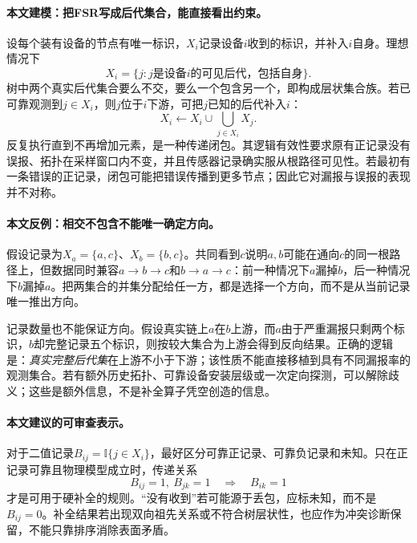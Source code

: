 \paragraph{本文建模：把FSR写成后代集合，能直接看出约束。}
设每个装有设备的节点有唯一标识，$X_i$记录设备$i$收到的标识，并补入$i$自身。理想情况下
\begin{equation}
 X_i=\{j:j\text{是设备}i\text{的可见后代，包括自身}\}.
 \label{eq:p4-descendant-set}
\end{equation}
树中两个真实后代集合要么不交，要么一个包含另一个，即构成层状集合族。若已可靠观测到$j\in X_i$，则$j$位于$i$下游，可把$j$已知的后代补入$i$：
\begin{equation}
 X_i\leftarrow X_i\cup\!\bigcup_{j\in X_i}X_j.
 \label{eq:p4-closure}
\end{equation}
反复执行直到不再增加元素，是一种传递闭包。其逻辑有效性要求原有正记录没有误报、拓扑在采样窗口内不变，并且传感器记录确实服从根路径可见性。若最初有一条错误的正记录，闭包可能把错误传播到更多节点；因此它对漏报与误报的表现并不对称。

\paragraph{本文反例：相交不包含不能唯一确定方向。}
假设记录为$X_a=\{a,c\}$、$X_b=\{b,c\}$。共同看到$c$说明$a,b$可能在通向$c$的同一根路径上，但数据同时兼容$a\to b\to c$和$b\to a\to c$：前一种情况下$a$漏掉$b$，后一种情况下$b$漏掉$a$。把两集合的并集分配给任一方，都是选择一个方向，而不是从当前记录唯一推出方向。

记录数量也不能保证方向。假设真实链上$a$在$b$上游，而$a$由于严重漏报只剩两个标识，$b$却完整记录五个标识，则按较大集合为上游会得到反向结果。正确的逻辑是：\emph{真实完整后代集}在上游不小于下游；该性质不能直接移植到具有不同漏报率的观测集合。若有额外历史拓扑、可靠设备安装层级或一次定向探测，可以解除歧义；这些是额外信息，不是补全算子凭空创造的信息。

\paragraph{本文建议的可审查表示。}
对于二值记录$B_{ij}=\mathbb I\{j\in X_i\}$，最好区分可靠正记录、可靠负记录和未知。只在正记录可靠且物理模型成立时，传递关系
\begin{equation}
 B_{ij}=1,\ B_{jk}=1\quad\Longrightarrow\quad B_{ik}=1
 \label{eq:p4-transitivity}
\end{equation}
才是可用于硬补全的规则。“没有收到”若可能源于丢包，应标未知，而不是$B_{ij}=0$。补全结果若出现双向祖先关系或不符合树层状性，也应作为冲突诊断保留，不能只靠排序消除表面矛盾。

